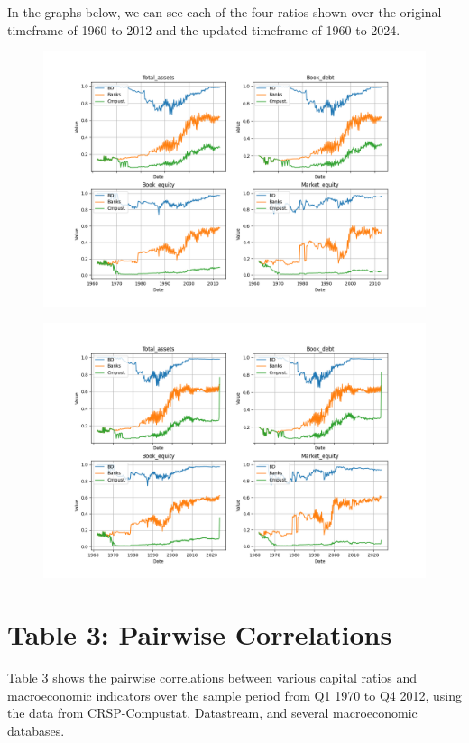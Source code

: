 \documentclass{article}
\begin{document}
\clearpage
In the graphs below, we can see each of the four ratios shown over the original timeframe of 1960 to 2012 and the updated timeframe of 1960 to 2024.\clearpage

\begin{figure}[htbp]\centering\includegraphics[width=\linewidth]{table02_figure.png}\end{figure}\par
\begin{figure}[htbp]\centering\includegraphics[width=\linewidth]{updated_table02_figure.png}\end{figure}\par
\section*{Table 3: Pairwise Correlations}

Table 3 shows the pairwise correlations between various capital ratios and macroeconomic indicators over the sample period from Q1 1970 to Q4 2012, using the data from CRSP-Compustat, Datastream, and several macroeconomic databases.
\end{document}
